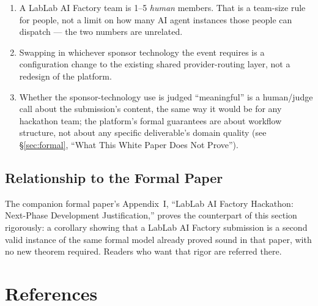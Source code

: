 \documentclass[12pt]{article}
\begin{document}
\begin{enumerate}
    \item A LabLab AI Factory team is 1--5 \emph{human} members.  That
          is a team-size rule for people, not a limit on how many AI
          agent instances those people can dispatch --- the two
          numbers are unrelated.
    \item Swapping in whichever sponsor technology the event requires
          is a configuration change to the existing shared
          provider-routing layer, not a redesign of the platform.
    \item Whether the sponsor-technology use is judged ``meaningful''
          is a human/judge call about the submission's content, the
          same way it would be for any hackathon team; the platform's
          formal guarantees are about workflow structure, not about
          any specific deliverable's domain quality (see
          \S\ref{sec:formal}, ``What This White Paper Does Not
          Prove'').
\end{enumerate}

\subsection{Relationship to the Formal Paper}

The companion formal paper's Appendix~I, ``LabLab AI Factory
Hackathon: Next-Phase Development Justification,'' proves the
counterpart of this section rigorously: a corollary showing that a
LabLab AI Factory submission is a second valid instance of the same
formal model already proved sound in that paper, with no new theorem
required.  Readers who want that rigor are referred there.

\newpage
\section*{References}
\label{sec:references}
\end{document}
